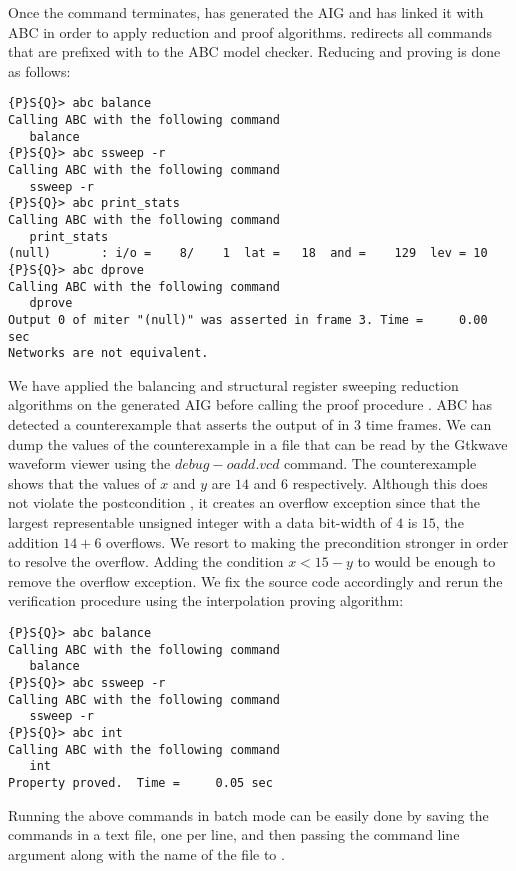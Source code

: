 Once the  command terminates, \mytool{} has generated the AIG \aigcircuit{}
and has linked it with ABC in order to apply reduction and proof algorithms. \mytool{} redirects
all commands that are prefixed with  to the ABC model checker. Reducing and proving 
\aigcircuit{} is done as follows:
\begin{Verbatim}[fontsize=\relsize{-2.0}]
{P}S{Q}> abc balance
Calling ABC with the following command
   balance 
{P}S{Q}> abc ssweep -r
Calling ABC with the following command
   ssweep -r 
{P}S{Q}> abc print_stats
Calling ABC with the following command
   print_stats 
(null)       : i/o =    8/    1  lat =   18  and =    129  lev = 10
{P}S{Q}> abc dprove 
Calling ABC with the following command
   dprove 
Output 0 of miter "(null)" was asserted in frame 3. Time =     0.00 sec
Networks are not equivalent.
\end{Verbatim}
We have applied the balancing and structural register sweeping reduction algorithms on the 
generated AIG before calling the proof procedure . ABC has detected a counterexample
that asserts the output of \aigcircuit{} in $3$ time frames. We can dump the values of the
counterexample in a  file that can be read by the Gtkwave waveform viewer using 
the $debug -o add.vcd$ command. The counterexample
shows that the values of $x$ and $y$ are $14$ and $6$ respectively. Although this does not violate
the postcondition \Post, it creates an overflow exception since that the largest representable unsigned 
integer with a data bit-width of $4$ is $15$, \ie{} the addition $14 + 6$ overflows. 
We resort to making the precondition \Pre stronger in order to resolve the overflow. Adding the condition 
$x < 15 - y$ to \Pre would be enough to remove the overflow exception. We fix the source code accordingly and
rerun the verification procedure using the interpolation proving algorithm:
\begin{Verbatim}[fontsize=\relsize{-2.0}]
{P}S{Q}> abc balance
Calling ABC with the following command
   balance 
{P}S{Q}> abc ssweep -r
Calling ABC with the following command
   ssweep -r 
{P}S{Q}> abc int
Calling ABC with the following command
   int 
Property proved.  Time =     0.05 sec
\end{Verbatim}

Running the above commands in batch mode can be easily done by saving the commands in a text
file, one per line, and then passing the  command line argument along with the name 
of the file to \mytool{}.

